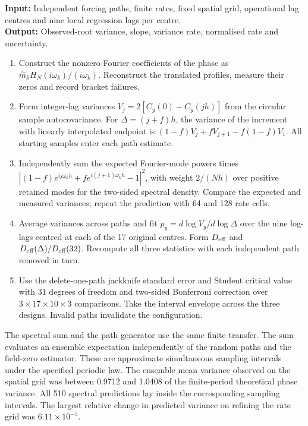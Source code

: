 \documentclass[11pt]{article}
\begin{document}
\begin{algorithm}[htbp]
\caption{Actual-root increment variance and its independent spectral check}
\small\textbf{Input:} Independent forcing paths, finite rates, fixed spatial grid, operational lag centres and nine local regression lags per centre.\\
\textbf{Output:} Observed-root variance, slope, variance rate, normalised rate and uncertainty.
\begin{enumerate}\setlength{\itemsep}{0.1em}
\item Construct the nonzero Fourier coefficients of the phase as
\(\widehat m_k H_N(i\omega_k)/(i\omega_k)\).
Reconstruct the translated profiles, measure their zeros and record bracket failures.
\item Form integer-lag variances \(V_j=2[C_y(0)-C_y(jh)]\) from the circular
sample autocovariance. For \(\Delta=(j+f)h\), the variance of the increment
with linearly interpolated endpoint is
\((1-f)V_j+fV_{j+1}-f(1-f)V_1\). All starting samples enter each path estimate.
\item Independently sum the expected Fourier-mode powers times
\(\left|(1-f)e^{ij\omega_kh}+fe^{i(j+1)\omega_kh}-1\right|^2\),
with weight \(2/(Nh)\) over positive retained modes for the two-sided
spectral density. Compare the expected and measured variances; repeat the
prediction with 64 and 128 rate cells.
\item Average variances across paths and fit \(p_y=d\log V_y/d\log\Delta\)
over the nine log-lags centred at each of the 17 original centres. Form
\(D_{\rm eff}\) and \(D_{\rm eff}(\Delta)/D_{\rm eff}(32)\).
Recompute all three statistics with each independent path removed in turn.
\item Use the delete-one-path jackknife standard error and Student critical
value with 31 degrees of freedom and two-sided Bonferroni correction over
\(3\times17\times10\times3\) comparisons. Take the interval envelope across
the three designs. Invalid paths invalidate the configuration.
\end{enumerate}
\end{algorithm}
The spectral sum and the path generator use the same finite transfer. The sum evaluates an ensemble expectation independently of the random paths and the field-zero estimator.
These are approximate simultaneous sampling intervals under the specified
periodic law. The ensemble mean variance observed on the spatial grid was
between 0.9712 and 1.0408 of the finite-period theoretical phase variance.
All 510 spectral predictions lay inside the corresponding sampling intervals.
The largest relative change in predicted variance on refining the rate grid
was \(6.11\times10^{-5}\).
\end{document}
